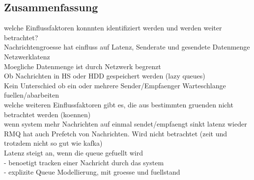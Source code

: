 

\subsection{Zusammenfassung}
welche Einflussfaktoren konnnten identifiziert werden und werden weiter betrachtet? \\
Nachrichtengroesse hat einfluss auf Latenz, Senderate und gesendete Datenmenge \\
Netzwerklatenz \\
Moegliche Datenmenge ist durch Netzwerk begrenzt\\
Ob Nachrichten in HS oder HDD gespeichert werden (lazy queues) \\
Kein Unterschied ob ein oder mehrere Sender/Empfaenger Warteschlange fuellen/abarbeiten \\

welche weiteren Einflussfaktoren gibt es, die aus bestimmten gruenden nicht betrachtet werden (koennen)\\
wenn system mehr Nachrichten auf einmal sendet/empfaengt sinkt latenz wieder \\
RMQ hat auch Prefetch von Nachrichten. Wird nicht betrachtet (zeit und trotzdem nicht so gut wie kafka) \\
Latenz steigt an, wenn die queue gefuellt wird \\
- benoetigt tracken einer Nachricht durch das system \\
- explizite Queue Modellierung, mit groesse und fuellstand \\


